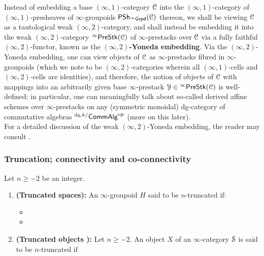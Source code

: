                 \begin{remark} \label{remark: weak_(infinity, 2)_yoneda}
                    Instead of embedding a base $(\infty, 1)$-category $\C$ into the $(\infty, 1)$-category of $(\infty, 1)$-presheaves of $\infty$-groupoids $\Psh_{{}^{\infty}\Grpd}(\C)$ thereon, we shall be viewing $\C$ as a tautological weak $(\infty, 2)$-category, and shall instead be embedding it into the weak $(\infty, 2)$-category ${}^{\infty}\Pre\Stk(\C)$ of $\infty$-prestacks over $\C$ via a fully faithful $(\infty, 2)$-functor, known as the \textbf{$(\infty, 2)$-Yoneda embedding}. Via the $(\infty, 2)$-Yoneda embedding, one can view objects of $\C$ as $\infty$-prestacks fibred in $\infty$-groupoids (which we note to be $(\infty, 2)$-categories wherein all $(\infty, 1)$-cells and $(\infty, 2)$-cells are identities), and therefore, the notion of objects of $\C$ with mappings into an arbitrarily given base $\infty$-prestack $\calY \in {}^{\infty}\Pre\Stk(\C)$ is well-defined; in particular, one can meaningfully talk about so-called derived affine schemes over $\infty$-prestacks on any (symmetric monoidal) dg-category of commutative algebras ${}^{\dg, k/}\Comm\Alg^{\op}$ (more on this later). 
                    \\
                    For a detailed discussion of the weak $(\infty, 2)$-Yoneda embedding, the reader may consult \cite{nlab:yoneda_lemma_for_bicategories}.
                \end{remark}
                
            \subsubsection{Truncation; connectivity and co-connectivity}
                \begin{definition} \label{def: truncated_objects} 
                    Let $n \geq -2$ be an integer.
                    \begin{enumerate}
                        \item \textbf{(Truncated spaces):} An $\infty$-groupoid $H$ said to be $n$-truncated if:
                            \begin{itemize}
                                \item  
                                \item
                            \end{itemize}
                        \item \textbf{(Truncated objects \cite[Definition 5.5.6.1]{HTT}):} Let $n \geq -2$. An object $X$ of an $\infty$-category $\S$ is said to be $n$-truncated if
                    \end{enumerate}
                \end{definition}
    
